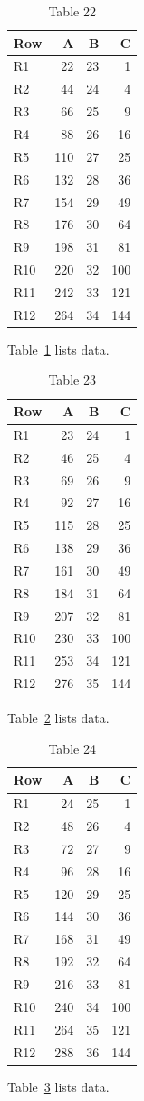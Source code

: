 \documentclass[10pt]{article}
\begin{document}
\begin{table}[ht]\centering\caption{Table 22}\label{tab:22}\begin{tabular}{lrrr}\toprule Row&A&B&C\\\midrule
R1&22&23&1\\
R2&44&24&4\\
R3&66&25&9\\
R4&88&26&16\\
R5&110&27&25\\
R6&132&28&36\\
R7&154&29&49\\
R8&176&30&64\\
R9&198&31&81\\
R10&220&32&100\\
R11&242&33&121\\
R12&264&34&144\\
\bottomrule\end{tabular}\end{table} Table~\ref{tab:22} lists data.
\begin{table}[ht]\centering\caption{Table 23}\label{tab:23}\begin{tabular}{lrrr}\toprule Row&A&B&C\\\midrule
R1&23&24&1\\
R2&46&25&4\\
R3&69&26&9\\
R4&92&27&16\\
R5&115&28&25\\
R6&138&29&36\\
R7&161&30&49\\
R8&184&31&64\\
R9&207&32&81\\
R10&230&33&100\\
R11&253&34&121\\
R12&276&35&144\\
\bottomrule\end{tabular}\end{table} Table~\ref{tab:23} lists data.
\begin{table}[ht]\centering\caption{Table 24}\label{tab:24}\begin{tabular}{lrrr}\toprule Row&A&B&C\\\midrule
R1&24&25&1\\
R2&48&26&4\\
R3&72&27&9\\
R4&96&28&16\\
R5&120&29&25\\
R6&144&30&36\\
R7&168&31&49\\
R8&192&32&64\\
R9&216&33&81\\
R10&240&34&100\\
R11&264&35&121\\
R12&288&36&144\\
\bottomrule\end{tabular}\end{table}\clearpage Table~\ref{tab:24} lists data.
\end{document}
